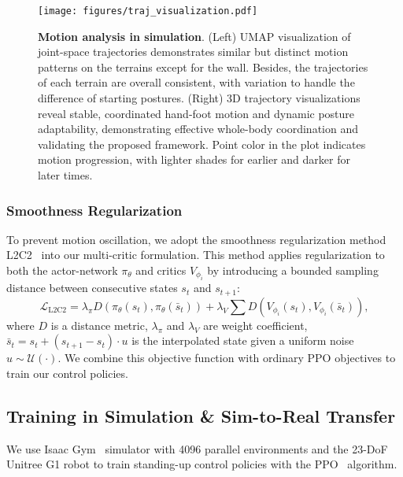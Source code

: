 
\begin{figure*}[t]
    \centering
    \texttt{[image: figures/traj\_visualization.pdf]}
    \caption{\textbf{Motion analysis in simulation}. (Left) UMAP visualization of joint-space trajectories demonstrates similar but distinct motion patterns on the terrains except for the wall. Besides, the trajectories of each terrain are overall consistent, with variation to handle the difference of starting postures. (Right) 3D trajectory visualizations reveal stable, coordinated hand-foot motion and dynamic posture adaptability, demonstrating effective whole-body coordination and validating the proposed framework. Point color in the plot indicates motion progression, with lighter shades for earlier and darker for later times.}
    \label{fig:trajectory}
    \vspace{-0.1in}
\end{figure*}


\subsubsection{Smoothness Regularization} To prevent motion oscillation, we adopt the smoothness regularization method L2C2~\cite{Kobayashi2022L2C2LL} into our multi-critic formulation. This method applies regularization to both the actor-network $\pi_\theta$ and critics $V_{\phi_i}$ by introducing a bounded sampling distance between consecutive states $s_t$ and $s_{t+1}$:
\begin{equation*}
   \mathcal{L}_{\mathrm{L2C2}} = \lambda_\pi D(\pi_\theta(s_t), \pi_\theta(\bar{s}_t)) +\lambda_V \sum D(V_{\phi_i}(s_t), V_{\phi_i}(\bar{s}_t)),
\end{equation*}
where $D$ is a distance metric, $\lambda_\pi$ and $\lambda_V$ are weight coefficient, $\bar{s}_t=s_t+(s_{t+1}-s_t)\cdot u$ is the interpolated state given a uniform noise $u\sim \mathcal{U}(\cdot)$. We combine this objective function with ordinary PPO objectives to train our control policies. 

\subsection{Training in Simulation \& Sim-to-Real Transfer}\label{subsec:simulation}
We use Isaac Gym~\cite{makoviychuk2021isaac} simulator with 4096 parallel environments and the 23-DoF Unitree G1 robot to train standing-up control policies with the PPO~\cite{schulman2017proximal} algorithm.

